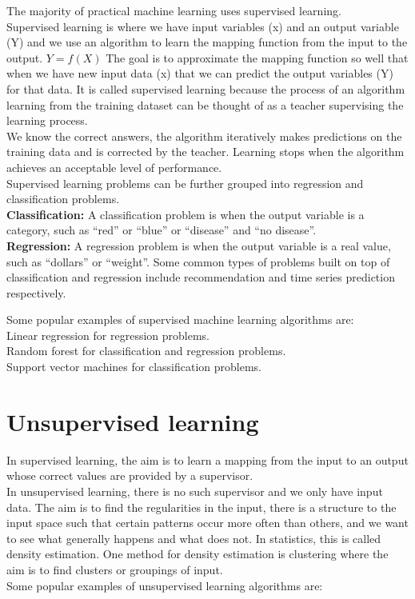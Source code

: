 The majority of practical machine learning uses supervised learning.\\
Supervised learning is where we have input variables (x) and an output variable (Y) and we use an algorithm to learn the mapping function from the input to the output.
\newline
$Y = f(X)$
\newline
The goal is to approximate the mapping function so well that when we have new input data (x) that we can predict the output variables (Y) for that data.
\newline
It is called supervised learning because the process of an algorithm learning from the training dataset can be thought of as a teacher supervising the learning process.\\ We know the correct answers, the algorithm iteratively makes predictions on the training data and is corrected by the teacher. Learning stops when the algorithm achieves an acceptable level of performance.\\
\newline
Supervised learning problems can be further grouped into regression and classification problems.\\
\newline
\textbf{Classification:} A classification problem is when the output variable is a category, such as “red” or “blue” or “disease” and “no disease”.\\ \textbf{Regression:}  A regression problem is when the output variable is a real value, such as “dollars” or “weight”.
Some common types of problems built on top of classification and regression include recommendation and time series prediction respectively.

Some popular examples of supervised machine learning algorithms are:\\
Linear regression for regression problems.\\
Random forest for classification and regression problems.\\
Support vector machines for classification problems.



\section{Unsupervised learning}

In supervised learning, the aim is to learn a mapping from the input to
an output whose correct values are provided by a supervisor.\\
In unsupervised
learning, there is no such supervisor and we only have input data.
The aim is to find the regularities in the input, there is a structure to the
input space such that certain patterns occur more often than others, and we want to see what generally happens and what does not. In statistics, this is called density estimation.
One method for density estimation is clustering where the aim is to
find clusters or groupings of input.\\ 
Some popular examples of unsupervised learning algorithms are:


